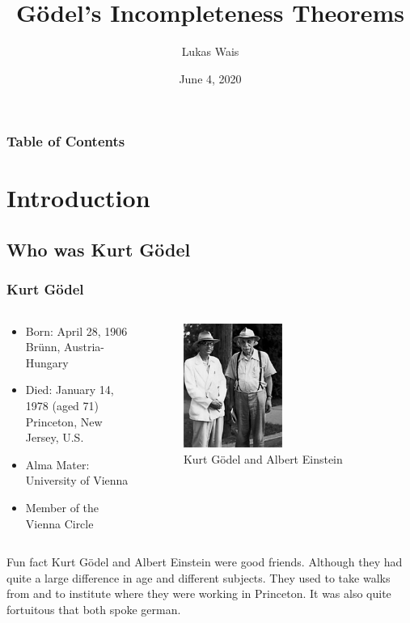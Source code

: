 \documentclass[aspectratio=169]{beamer}
\title{Gödel's Incompleteness Theorems}
\author{Lukas Wais}
\institute{Special Topics Course 326.901}
\date{June 4, 2020}
\begin{document}
\frame{\titlepage}
\begin{frame}[allowframebreaks]
	\frametitle{Table of Contents}
	\tableofcontents
\end{frame}
\section{Introduction}
\subsection{Who was Kurt Gödel}
\begin{frame}[allowframebreaks]
	\frametitle{Kurt Gödel}
	\begin{columns}
		\begin{column}{0.5\textwidth}
   			\begin{itemize}
   				\item Born: April 28, 1906 Brünn, Austria-Hungary
   				\item Died: January 14, 1978 (aged 71) Princeton, New Jersey, U.S.
   				\item Alma Mater: University of Vienna
   				\item Member of the Vienna Circle
   			\end{itemize}
   		\end{column}
		\begin{column}{0.4\textwidth}
			\begin{figure}[h]
				\centering
				\includegraphics[width=0.5\textwidth]{img/godel_albert}
				\caption{Kurt Gödel and Albert Einstein}
			\end{figure}
		\end{column}	
	\end{columns}
	\begin{block}{Fun fact}
		Kurt Gödel and Albert Einstein were good friends. Although they had quite a large difference in age and different subjects. They used to take walks from and to institute where they were working in Princeton. It was also quite fortuitous that both spoke german.
	\end{block}
\end{frame}
\end{document}
